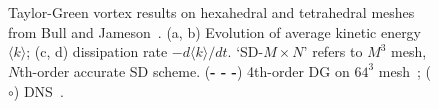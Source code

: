 \begin{figure}[htbp]
\centering
{}
\\
\\
\caption{\small Taylor-Green vortex results on hexahedral and tetrahedral meshes from Bull and Jameson~\cite{bull2013a}.
(a, b) Evolution of average kinetic energy $\langle k \rangle$; (c, d) dissipation rate $-d \langle k \rangle/dt$.
`SD-$M \times N$' refers to $M^3$ mesh, $N$th-order accurate SD scheme.
(\textbf{- - -}) 4th-order DG on $64^3$ mesh~\cite{beck:12}; ($\circ$) DNS~\cite{debonis:13}.}
\label{dissrate}
\end{figure}


